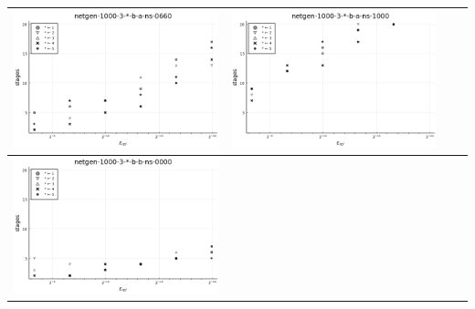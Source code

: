\documentclass{article}
\begin{document}
\begin{landscape}
\begin{center}
\begin{longtable}{| c | c | c | c |}
\includegraphics[height=0.22\textheight]{hiter_fixlim_netgen-1000-3-_-b-a-ns-0660.png} &
\includegraphics[height=0.22\textheight]{hiter_fixlim_netgen-1000-3-_-b-a-ns-1000.png} \\
                \hline
\includegraphics[height=0.22\textheight]{hiter_fixlim_netgen-1000-3-_-b-b-ns-0000.png} &

\end{longtable}
\end{center}
\end{landscape}
\end{document}
